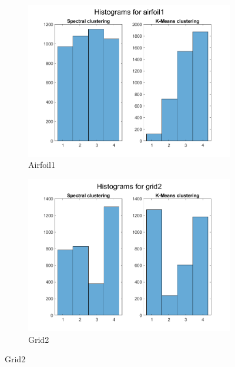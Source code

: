 \documentclass[unicode,11pt,a4paper,oneside,numbers=endperiod,openany]{scrartcl}
\begin{document}
\begin{figure}[H]
    \centering
    \begin{subfigure}{0.45\textwidth}
        \centering
        \includegraphics[width=\linewidth]{figures/2.3_airfoil1.png}
        \caption{Airfoil1}
        \label{fig:airfoil1-2.3}
    \end{subfigure}
    \hfill
    \begin{subfigure}{0.45\textwidth}
        \centering
        \includegraphics[width=\linewidth]{figures/2.3_grid2.png}
        \caption{Grid2}
        \label{fig:grid2-2.3}
    \end{subfigure}


\end{figure}
\end{document}
